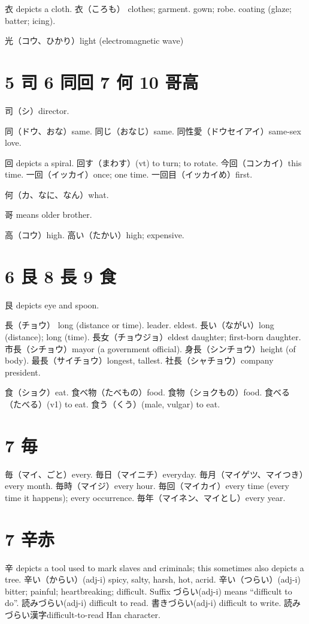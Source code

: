 衣 depicts a cloth.
衣（ころも）
clothes;
garment. gown;
robe. coating (glaze; batter; icing).

光（コウ、ひかり）light (electromagnetic wave)

\section{5 司 6 同回 7 何 10 哥高}

司（シ）director.

同（ドウ、おな）same.
同じ（おなじ）same.
同性愛（ドウセイアイ）same-sex love.

回 depicts a spiral.
回す（まわす）(vt) to turn; to rotate.
今回（コンカイ）this time.
一回（イッカイ）once; one time.
一回目（イッカイめ）first.

何（カ、なに、なん）what.

哥 means older brother.

高（コウ）high.
高い（たかい）high; expensive.

\section{6 艮 8 長 9 食}

艮 depicts eye and spoon.

長（チョウ）
long (distance or time).
leader.
eldest.
長い（ながい）long (distance); long (time).
長女（チョウジョ）eldest daughter; first-born daughter.
市長（シチョウ）mayor (a government official).
身長（シンチョウ）height (of body).
最長（サイチョウ）longest, tallest.
社長（シャチョウ）company president.

食（ショク）eat.
食べ物（たべもの）food.
食物（ショクもの）food.
食べる（たべる）(v1) to eat.
食う（くう）(male, vulgar) to eat.

\section{7 毎}

毎（マイ、ごと）every.
毎日（マイニチ）everyday.
毎月（マイゲツ、マイつき）every month.
毎時（マイジ）every hour.
毎回（マイカイ）every time (every time it happens); every occurrence.
毎年（マイネン、マイとし）every year.

\section{7 辛赤}

辛 depicts a tool used to mark slaves and criminals;
this sometimes also depicts a tree.
辛い（からい）(adj-i) spicy, salty, harsh, hot, acrid.
辛い（つらい）(adj-i) bitter; painful; heartbreaking; difficult.
Suffix づらい(adj-i) means ``difficult to do''.
読みづらい(adj-i) difficult to read.
書きづらい(adj-i) difficult to write.
読みづらい漢字difficult-to-read Han character.

